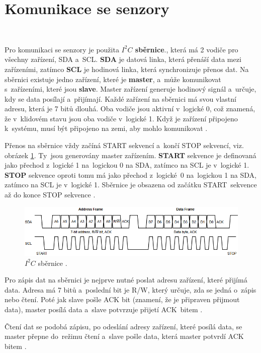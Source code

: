\section{Komunikace se senzory}\

Pro komunikaci se senzory je použita \textbf{$I^2C$ sběrnice}., která má 2
vodiče pro všechny zařízení, SDA a~SCL. \textbf{SDA} je datová linka, která
přenáší data mezi zařízeními, zatímco \textbf{SCL} je hodinová linka, která
synchronizuje přenos dat. Na sběrnici existuje jedno zařízení, které je
\textbf{master}, a~může komunikovat s~zařízeními, které jsou \textbf{slave}. Master
zařízení generuje hodinový signál a~určuje, kdy se data posílají a~přijímají. Každé
zařízení na sběrnici má svou vlastní adresu, která je 7 bitů dlouhá. Oba vodiče jsou
aktivní v~logické 0, což znamená, že v~klidovém stavu jsou oba vodiče v~logické 1.
Když je zařízení připojeno k~systému, musí být připojeno na zemi, aby mohlo
komunikovat \cite{I2C}.

Přenos na sběrnice vždy začíná START sekvencí a~končí STOP sekvencí, viz. obrázek
\ref{fig:I2C_FRAME}. Ty~jsou generovány master zařízením. \textbf{START} sekvence je
definovaná jako přechod z~logické 1 na~logickou 0 na SDA, zatímco na SCL je
v~logické 1. \textbf{STOP} sekvence oproti tomu má jako přechod z~logické~0
na~logickou 1 na SDA, zatímco na SCL je v~logické 1. Sběrnice je obsazena od začátku
START~sekvence až do konce STOP sekvence \cite{I2C}.

\begin{figure}[!h]
    \centering
    \includegraphics[width = .9\linewidth]{Figures/I2C_FRAME.png}
    \caption{$I^2C$ sběrnice \cite{I2C}.}
    \label{fig:I2C_FRAME}
\end{figure}

Pro zápis dat na sběrnici je nejprve nutné poslat adresu zařízení, které přijímá
data. Adresa má 7 bitů a~poslední bit je R/W, který určuje, zda se jedná o~zápis
nebo čtení. Poté jak slave pošle ACK bit (znamení, že je připraven přijmout data),
master posílá data a~slave potvrzuje přijetí ACK~bitem \cite{I2C}.

Čtení dat se podobá zápisu, po odeslání adresy zařízení, které posílá data, se
master přepne do~režimu čtení a~slave pošle data, která master potvrdí ACK
bitem \cite{I2C}.

